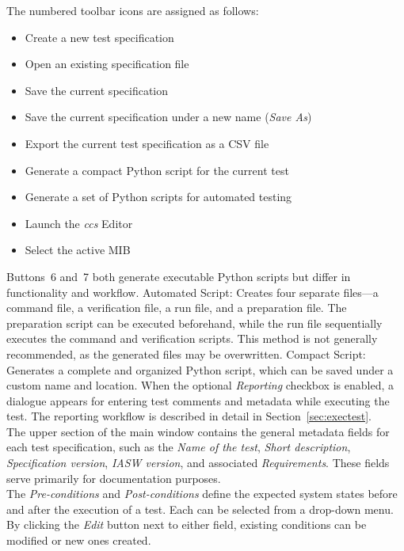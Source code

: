 The numbered toolbar icons are assigned as follows:
\begin{itemize}
\item[1.] Create a new test specification
\item[2.] Open an existing specification file
\item[3.] Save the current specification
\item[4.] Save the current specification under a new name (\emph{Save As})
\item[5.] Export the current test specification as a CSV file
\item[6.] Generate a compact Python script for the current test
\item[7.] Generate a set of Python scripts for automated testing
\item[8.] Launch the \textit{ccs} Editor
\item[9.] Select the active MIB
\end{itemize}

Buttons~6 and~7 both generate executable Python scripts but differ in functionality and workflow. 
Automated Script: Creates four separate files—a command file, a verification file, a run file, and a preparation file. 
The preparation script can be executed beforehand, while the run file sequentially executes the command and verification scripts. 
This method is not generally recommended, as the generated files may be overwritten.
Compact Script: Generates a complete and organized Python script, which can be saved under a custom name and location. 
When the optional \emph{Reporting} checkbox is enabled, a dialogue appears for entering test comments and metadata while executing the test. 
The reporting workflow is described in detail in Section~\ref{sec:exectest}. \\

The upper section of the main window contains the general metadata fields for each test specification, such as the \emph{Name of the test}, \emph{Short description}, \emph{Specification version}, \emph{IASW version}, and associated \emph{Requirements}. 
These fields serve primarily for documentation purposes. \\

The \emph{Pre-conditions} and \emph{Post-conditions} define the expected system states before and after the execution of a test. 
Each can be selected from a drop-down menu. By clicking the \emph{Edit} button next to either field, existing conditions can be modified or new ones created. \\


